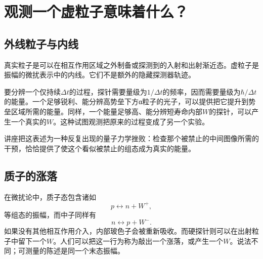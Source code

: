 \section{观测一个虚粒子意味着什么？}

\subsection{外线粒子与内线}

真实粒子是可以在相互作用区域之外制备或探测到的入射和出射渐近态。虚粒子是振幅的微扰表示中的内线。它们不是额外的隐藏探测器轨迹。

\begin{classroomqa}
\end{classroomqa}

要分辨一个仅持续\(\Delta t\)的过程，探针需要量级为\(1/\Delta t\)的频率，因而需要量级为\(\hbar/\Delta t\)的能量。一个足够锐利、能分辨高势垒下方{\proseunicodefont α}粒子的光子，可以提供把它提升到势垒区域所需的能量。同样，一个能量足够高、能分辨短寿命内部\(W\)的探针，可以产生一个真实的\(W\)。这种试图观测把原来的过程变成了另一个实验。

讲座把这表述为一种反复出现的量子力学挫败：检查那个被禁止的中间图像所需的干预，恰恰提供了使这个看似被禁止的组态成为真实的能量。

\subsection{质子的涨落}

在微扰论中，质子态包含诸如
\begin{equation}
  p\longleftrightarrow n+W^+,
\end{equation}
等组态的振幅，而中子同样有
\begin{equation}
  n\longleftrightarrow p+W^-.
\end{equation}
如果没有其他相互作用介入，内部玻色子会被重新吸收。而硬探针则可以在出射粒子中留下一个\(W\)。人们可以把这一行为称为敲出一个涨落，或产生一个\(W\)。说法不同；可测量的陈述是同一个末态振幅。

\begin{classroomqa}
\end{classroomqa}

